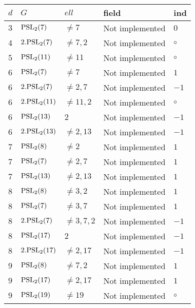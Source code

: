 \documentclass[a4paper, 11pt]{article}
\begin{document}
	\begin{longtable}{lllll} \hline
		$ d $ & $ G $ & $ ell $ & field & ind \\ \hline \hline
        $ 3 $ & $ {\rm PSL}_{2}(7) $ & $ \neq 7 $ & Not implemented & $ 0 $ \\ \hline
        $ 4 $ & $ 2.{\rm PSL}_{2}(7) $ & $ \neq 7, 2 $ & Not implemented & $\circ$ \\ \hline
        $ 5 $ & $ {\rm PSL}_{2}(11) $ & $ \neq 11 $ & Not implemented & $\circ$ \\ \hline
        $ 6 $ & $ {\rm PSL}_{2}(7) $ & $ \neq 7 $ & Not implemented & $ 1  $ \\ \hline
        $ 6 $ & $ 2.{\rm PSL}_{2}(7) $ & $ \neq 2, 7 $ & Not implemented & $ -1  $ \\ \hline
        $ 6 $ & $ 2.{\rm PSL}_{2}(11) $ & $ \neq 11, 2 $ & Not implemented & $\circ$ \\ \hline
        $ 6 $ & $ {\rm PSL}_{2}(13) $ & $ 2 $ & Not implemented & $ -1  $ \\ \hline
        $ 6 $ & $ 2.{\rm PSL}_{2}(13) $ & $ \neq 2, 13 $ & Not implemented & $ -1  $ \\ \hline
        $ 7 $ & $ {\rm PSL}_{2}(8) $ & $ \neq 2 $ & Not implemented & $ 1  $ \\ \hline
        $ 7 $ & $ {\rm PSL}_{2}(7) $ & $ \neq 2, 7 $ & Not implemented & $ 1  $ \\ \hline
        $ 7 $ & $ {\rm PSL}_{2}(13) $ & $ \neq 2, 13 $ & Not implemented & $ 1  $ \\ \hline
        $ 8 $ & $ {\rm PSL}_{2}(8) $ & $ \neq 3, 2 $ & Not implemented & $ 1  $ \\ \hline
        $ 8 $ & $ {\rm PSL}_{2}(7) $ & $ \neq 3, 7 $ & Not implemented & $ 1  $ \\ \hline
        $ 8 $ & $ 2.{\rm PSL}_{2}(7) $ & $ \neq 3, 7, 2 $ & Not implemented & $ -1  $ \\ \hline
        $ 8 $ & $ {\rm PSL}_{2}(17) $ & $ 2 $ & Not implemented & $ -1  $ \\ \hline
        $ 8 $ & $ 2.{\rm PSL}_{2}(17) $ & $ \neq 2, 17 $ & Not implemented & $ -1  $ \\ \hline
        $ 9 $ & $ {\rm PSL}_{2}(8) $ & $ \neq 7, 2 $ & Not implemented & $ 1  $ \\ \hline
        $ 9 $ & $ {\rm PSL}_{2}(17) $ & $ \neq 2, 17 $ & Not implemented & $ 1  $ \\ \hline
        $ 9 $ & $ {\rm PSL}_{2}(19) $ & $ \neq 19 $ & Not implemented & $\circ$ \\ \hline

\end{longtable}
\end{document}
